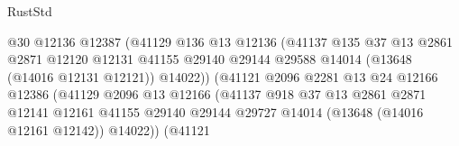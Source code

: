 \begin{lexlean}{RustStd}
\begin{coremodule}
                                          @30
                                          @12136
                                          @12387
                                          (@41129
                                            @136
                                            @13
                                            @12136
                                            (@41137
                                              @135
                                              @37
                                              @13
                                              @2861
                                              @2871
                                              @12120
                                              @12131
                                              @41155
                                              @29140
                                              @29144
                                              @29588
                                              @14014
                                              (@13648 (@14016 @12131 @12121))
                                              @14022))
                                          (@41121
                                            @2096
                                            @2281
                                            @13
                                            @24
                                            @12166
                                            @12386
                                            (@41129
                                              @2096
                                              @13
                                              @12166
                                              (@41137
                                                @918
                                                @37
                                                @13
                                                @2861
                                                @2871
                                                @12141
                                                @12161
                                                @41155
                                                @29140
                                                @29144
                                                @29727
                                                @14014
                                                (@13648 (@14016 @12161 @12142))
                                                @14022))
                                            (@41121

\end{coremodule}
\end{lexlean}
